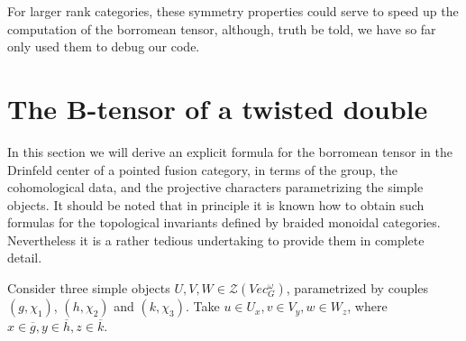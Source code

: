 \documentclass[11pt]{book}
\theoremstyle{Rem}
\theoremstyle{definition}
\numberwithin{equation}{section}
\newcommand{\gb}{\overline{g}}
\newcommand{\hb}{\overline{h}}
\newcommand{\kb}{\overline{k}}
\begin{document}
For larger rank categories, these symmetry properties could serve to speed up the computation of the borromean tensor, although, truth be told, we have so far only used them to debug our code.
\section{The B-tensor of a twisted double}\label{sec:borr-tens-twist}
\newcommand\Pe{P}

In this section we will derive an explicit formula for the borromean tensor in the Drinfeld center of a pointed fusion category, in terms of the group, the cohomological data, and the projective characters parametrizing the simple objects. It should be noted that in principle it is known how to obtain such formulas for the topological invariants defined by braided monoidal categories. Nevertheless it is a rather tedious undertaking to provide them in complete detail.


Consider three simple objects $ U, V, W \in  \mathcal{Z}(Vec^\omega_G)$, parametrized by couples $(g, \chi_1)$, $(h, \chi_2)$ and $(k, \chi_3)$. Take $u\in U_x, v\in V_y,  w\in W_z$, where $x\in \gb, y\in \hb, z\in \kb$.
\end{document}
